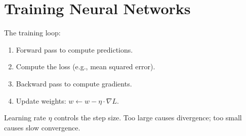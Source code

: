 \documentclass[11pt,a4paper]{article}
\begin{document}
\section{Training Neural Networks}
The training loop:
\begin{enumerate}
  \item Forward pass to compute predictions.
  \item Compute the loss (e.g., mean squared error).
  \item Backward pass to compute gradients.
  \item Update weights: $w \leftarrow w - \eta \cdot \nabla L$.
\end{enumerate}

Learning rate $\eta$ controls the step size. Too large causes divergence;
too small causes slow convergence.
\end{document}
